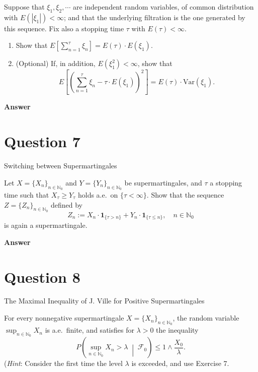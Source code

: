 \documentclass[letterpaper]{article}
\begin{document}
		Suppose that $\xi_1, \xi_2, \cdots$ are independent random variables, of common distribution with $E(|\xi_1|) < \infty$; and that the underlying filtration is the one generated by this sequence. Fix also a stopping time $\tau$ with $E(\tau) < \infty$.
	\begin{enumerate}
	\item[(i)] Show that $E\left[\sum_{n=1}^{\tau} \xi_n\right] = E(\tau) \cdot E(\xi_1)$.
	\item[(ii)$^*$] (Optional) If, in addition, $E(\xi_1^2) < \infty$, show that
	\[
	E\left[\left(\sum_{n=1}^{\tau} \xi_n - \tau \cdot E(\xi_1)\right)^2\right] = E(\tau) \cdot \mathrm{Var}(\xi_1).
	\]
\end{enumerate}
		
		\textbf{Answer}
		
		\clearpage
		
		\section{Question 7}
		
		{\color{deepred} Switching between Supermartingales} 
		
		Let $X = \{X_n\}_{n \in \mathbb{N}_0}$ and $Y = \{Y_n\}_{n \in \mathbb{N}_0}$ be supermartingales, and $\tau$ a stopping time such that $X_\tau \geq Y_\tau$ holds a.e.\ on $\{\tau < \infty\}$. Show that the sequence $Z = \{Z_n\}_{n \in \mathbb{N}_0}$ defined by
		\[
		Z_n := X_n \cdot \mathbf{1}_{\{\tau > n\}} + Y_n \cdot \mathbf{1}_{\{\tau \leq n\}}, \quad n \in \mathbb{N}_0
		\]
		is again a supermartingale.
		
		\textbf{Answer}
		
		\clearpage
		
		\section{Question 8}
		
		{\color{deepred}The Maximal Inequality of J. Ville for Positive Supermartingales} 
		
		For every nonnegative supermartingale $X = \{X_n\}_{n \in \mathbb{N}_0}$, the random variable $\sup_{n \in \mathbb{N}_0} X_n$ is a.e.\ finite, and satisfies for $\lambda > 0$ the inequality
	\[
P\left(\sup_{n \in \mathbb{N}_0} X_n > \lambda \;\middle|\; \mathcal{F}_0\right) \leq 1 \wedge \frac{X_0}{\lambda}.
\]
(\textit{Hint}: Consider the first time the level $\lambda$ is exceeded, and use Exercise 7.
\end{document}
